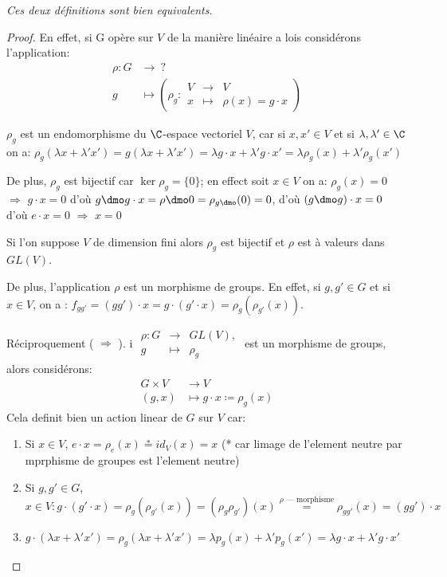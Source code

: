 \emph{Ces deux définitions sont bien equivalents}.
\begin{proof}
En effet, si G opère sur $V$ de la manière linéaire a lois considérons l'application:
\begin{align*}	
	\rho:G &\rightarrow \ ? \\
	g &\mapsto  \left(\rho_g:\begin{array}{rcl}V&\rightarrow& V \\ x&\mapsto&\rho(x)=g\cdot x\end{array}\right)
\end{align*}

$\rho_g$ est un endomorphisme du $\C$-espace vectoriel $V$, car si $x,x'\in V$ et si $\lambda, \lambda'\in \C$ on a:
$\rho_g(\lambda x + \lambda' x')=g(\lambda x+\lambda' x')=\lambda g\cdot x+\lambda'g\cdot x'=\lambda\rho_g(x)+\lambda'\rho_g(x')$

De plus, $\rho_g$ est bijectif car $\ker\rho_g=\{0\}$; en effect soit $x\in V$ on a: $\rho_g(x)=0$  $\Rightarrow$  $g\cdot x=0$ d'où $g\dmo g\cdot x= \rho\dmo 0=\rho_{g\dmo}(0)=0$,
d'où $(g\dmo g)\cdot x=0$ d'où $e\cdot x=0$  $\Rightarrow$  $x=0$

Si l'on suppose $V$ de dimension fini alors $\rho_g$ est bijectif et $\rho$ est à valeurs dans $GL(V)$.

De plus, l'application $\rho$ est un morphisme de groups. En effet, si $g,g'\in G$ et si $x\in V$, on a : $f_{gg'}=(gg')\cdot x= g\cdot (g'\cdot x)=\rho_g(\rho_{g'}(x))$.

Réciproquement ( $\Rightarrow$ ).
i $\begin{array}{rcl}\rho: G &\rightarrow & GL(V),\\ g &\mapsto &\rho_g\end{array}$ est un morphisme de groups, alors considérons: 
\begin{align*}
G\times V &\rightarrow  V\\ (g,x) &\mapsto g\cdot x\coloneq\rho_g(x)
\end{align*}
Cela definit bien un action linear de $G$ sur $V$ car:
\begin{enumerate}
	\item Si $x\in V$, $e\cdot x=\rho_e(x) \overset\ast= id_V(x)=x$ (* car limage de l'element neutre par mprphisme de groupes est l'element neutre)
	\item Si $g,g'\in G$, $x\in V: g\cdot(g'\cdot x)=\rho_g(\rho_{g'}(x))=(\rho_g\rho_{g'})(x)\overset{\rho\text{ --- morphisme}}{=}\rho_{gg'}(x)=(gg')\cdot x$
	\item $g\cdot (\lambda x+\lambda'x')=\rho_g(\lambda x+\lambda' x')= \lambda p_g(x)+\lambda' p_g(x')=\lambda g\cdot x+\lambda'g\cdot x'$
\end{enumerate}
\end{proof}


